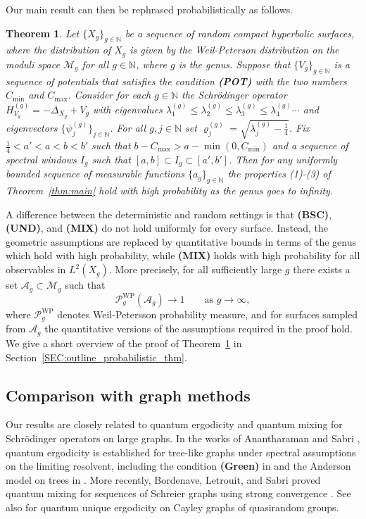 \documentclass[11pt,twoside,reqno]{amsart}
\newcommand{\N}{\mathbb{N}}
\renewcommand{\rho}{\varrho}
\newcommand{\1}{\mathrm{\mathbf{1}}}
\numberwithin{equation}{section}
\theoremstyle{plain}
\newtheorem{theorem}[thm]{Theorem}
\theoremstyle{definition}
\theoremstyle{remark}
\begin{document}
Our main result can then be rephrased probabilistically as follows.

\begin{theorem}\label{Thm:propalistic_main}
    Let $\{X_g\}_{g\in\N}$ be a sequence of random compact hyperbolic surfaces, where the distribution of $X_g$ is given by the Weil-Peterson distribution on the moduli space $\mathcal{M}_g$ for all $g\in\N$, where $g$ is the genus. Suppose that $\{V_g\}_{g\in\N}$ is a sequence of potentials that satisfies the condition {\normalfont\textbf{(POT)}} with the two numbers $C_{\min}$ and $C_{\max}$. Consider for each $g\in\N$ the Schr\"odinger operator  $H_{V_g}^{(g)}= -\Delta_{X_g}+V_g$ with eigenvalues $\lambda_1^{(g)}\leq \lambda_2^{(g)}\leq \lambda_3^{(g)} \leq \lambda_4^{(g)} \cdots $ and eigenvectors $\{\psi_j^{(g)}\}_{j\in\N}$. For all $g,j\in\N$ set $\rho_{j}^{(g)} = \sqrt{\lambda_j^{(g)}-\frac{1}{4}}$. Fix $\frac{1}{4}< a' < a < b < b'$  such that $b-C_{\max}>a  -\min(0, C_{\min})$ and a sequence of spectral windows $I_g$ such that $[a,b] \subset I_g \subset [a',b']$. Then for any uniformly bounded sequence of measurable functions $\{a_g\}_{g\in\N}$ the properties (1)-(3) of Theorem~\ref{thm:main} hold with high probability as the genus goes to infinity.
\end{theorem}

A difference between the deterministic and random settings is that
\textbf{(BSC)}, \textbf{(UND)}, and \textbf{(MIX)} do not hold uniformly for
every surface. Instead, the geometric assumptions are replaced by
quantitative bounds in terms of the genus which hold with high probability,
while \textbf{(MIX)} holds with high probability for all observables in
$L^2(X_g)$. More precisely, for all sufficiently large $g$ there exists a set
$\mathcal A_g\subset\mathcal M_g$ such that
\[
    \mathcal P_g^{\mathrm{WP}}(\mathcal A_g)\longrightarrow1
    \qquad\text{as }g\to\infty,
\]
where $\mathcal P_g^{\mathrm{WP}}$ denotes Weil-Petersson probability
measure, and for surfaces sampled from $\mathcal A_g$ the quantitative
versions of the assumptions required in the proof hold. We give a short
overview of the proof of Theorem~\ref{Thm:propalistic_main} in
Section~\ref{SEC:outline_probabilistic_thm}.

\subsection{Comparison with graph methods}

Our results are closely related to quantum ergodicity and quantum mixing for Schr\"odinger operators on large graphs. In the works of Anantharaman and Sabri \cite{AnantharamanSabriAnnals,anantharamanQuantumErgodicityAnderson2017}, quantum ergodicity is established for tree-like graphs under spectral assumptions on the limiting resolvent, including the condition \textbf{(Green)} in \cite{AnantharamanSabriAnnals} and the Anderson model on trees in \cite{anantharamanQuantumErgodicityAnderson2017}. More recently, Bordenave, Letrouit, and Sabri \cite{bordenave2026quantummixinglargeschreier} proved quantum mixing for sequences of Schreier graphs using strong convergence \cite{BordenaveCollins}. See also \cite{MageeThomasZhao2023} for quantum unique ergodicity on Cayley graphs of quasirandom groups.
\end{document}
